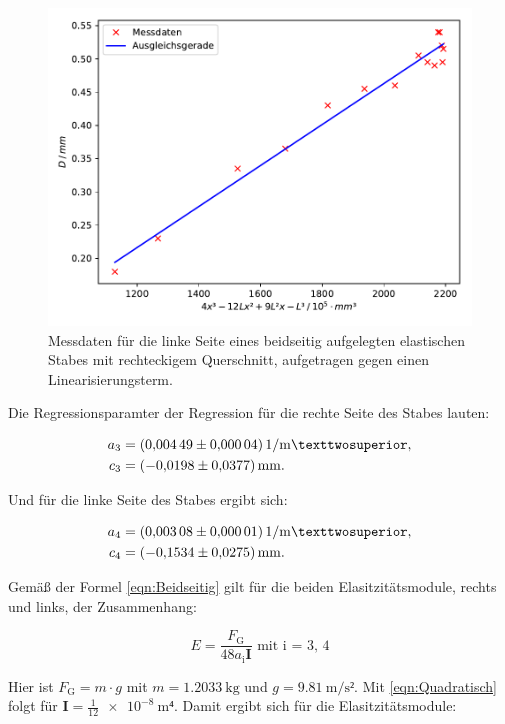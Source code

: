 \begin{figure}
  \centering
  \includegraphics[scale=0.8]{content/plot4.pdf}
  \caption{Messdaten für die linke Seite eines beidseitig aufgelegten elastischen Stabes mit 
  rechteckigem Querschnitt, aufgetragen gegen einen Linearisierungsterm.}
  \label{fig:plot4}
\end{figure}

Die Regressionsparamter der Regression für die rechte Seite des Stabes
lauten:

\begin{align*}
a_3 &= \SI{0.00449+-0.00004}{1\per\meter²},\\
c_3 &= \SI{-0.0198+-0.0377}{\milli\meter}.
\end{align*}

Und für die linke Seite des Stabes ergibt sich: 

\begin{align*}
a_4 &= \SI{0.00308+-0.00001}{1\per\meter²},\\
c_4 &= \SI{-0.1534+-0.0275}{\milli\meter}.
\end{align*}

Gemäß der Formel \eqref{eqn:Beidseitig} gilt für die beiden Elasitzitätsmodule, rechts und links, 
der Zusammenhang: 

\begin{equation*}
E = \frac{F_\text{G}}{48a_\text{i}\symbf{I}} \text{ mit i = 3, 4}
\end{equation*}

Hier ist $F_\text{G} = m\cdot g$ mit $m = \SI{1.2033}{\kilo\gram}$ und 
$g = \SI{9.81}{\meter\per\second²}$.
Mit \eqref{eqn:Quadratisch} folgt für $\symbf{I} = \frac{1}{12}\SI{e-8}{\meter⁴}$. Damit 
ergibt sich für die Elasitzitätsmodule: 

